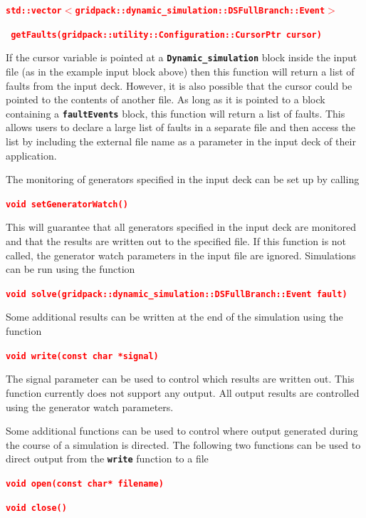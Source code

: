 \documentclass[12pt]{report} %
\begin{document}
\textcolor{red}{\texttt{\textbf{std::vector$\boldsymbol{\mathrm{<}}$gridpack::dynamic\_simulation::DSFullBranch::Event$\boldsymbol{\mathrm{>}}$}}}

\textcolor{red}{\texttt{\textbf{  getFaults(gridpack::utility::Configuration::CursorPtr cursor)}}}

If the cursor variable is pointed at a \texttt{\textbf{Dynamic\_simulation}} block inside the input file (as in the example input block above) then this function will return a list of faults from the input deck. However, it is also possible that the cursor could be pointed to the contents of another file. As long as it is pointed to a block containing a \texttt{\textbf{faultEvents}} block, this function will return a list of faults. This allows users to declare a large list of faults in a separate file and then access the list by including the external file name as a parameter in the input deck of their application.

The monitoring of generators specified in the input deck can be set up by calling

\textcolor{red}{\texttt{\textbf{void setGeneratorWatch()}}}

This will guarantee that all generators specified in the input deck are monitored and that the results are written out to the specified file. If this function is not called, the generator watch parameters in the input file are ignored.
Simulations can be run using the function

\textcolor{red}{\texttt{\textbf{void solve(gridpack::dynamic\_simulation::DSFullBranch::Event fault)}}}

Some additional results can be written at the end of the simulation using the function

\textcolor{red}{\texttt{\textbf{void write(const char *signal)}}}

The signal parameter can be used to control which results are written out. This function currently does not support any output. All output results are controlled using the generator watch parameters.

Some additional functions can be used to control where output generated during the course of a simulation is directed. The following two functions can be used to direct output from the \texttt{\textbf{write}} function to a file

\textcolor{red}{\texttt{\textbf{void open(const char* filename)}}}

\textcolor{red}{\texttt{\textbf{void close()}}}
\end{document}
